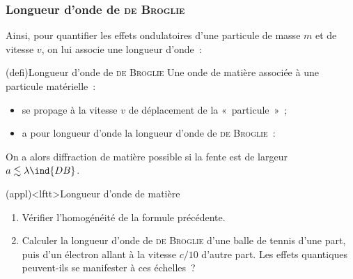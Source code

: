 \documentclass[../../main/main.tex]{subfiles}
\begin{document}
\subsubsection{Longueur d'onde de \textsc{de Broglie}}
\label{sssec:lgdb}
Ainsi, pour quantifier les effets ondulatoires d'une particule de masse $m$ et
de vitesse $v$, on lui associe une longueur d'onde~:
\begin{tcb*}(defi){Longueur d'onde de \textsc{de Broglie}}
	Une onde de matière associée à une particule matérielle~:
	\begin{itemize}
		\item se propage à la vitesse $v$ de déplacement de la «~particule~»~;
		\item a pour longueur d'onde la longueur d'onde de \textsc{de Broglie}~:
		      \psw{%
			      \[
				      \boxed{\lambda\ind{DB} = \frac{h}{p}}
			      \]
		      }%
	\end{itemize}
	On a alors diffraction de matière possible si la fente est de
	largeur $a \lesssim \lambda\ind{DB}$.
\end{tcb*}

\begin{tcb}[breakable](appl)<lftt>{Longueur d'onde de matière}
	\begin{enumerate}
		\item Vérifier l'homogénéité de la formule précédente.
		      \smallbreak
		\item Calculer la longueur d'onde de \textsc{de Broglie} d'une balle de
		      tennis d'une part, puis d'un électron allant à la vitesse $c/10$ d'autre
		      part. Les effets quantiques peuvent-ils se manifester à ces échelles~?
		      \smallbreak
	\end{enumerate}
\end{tcb}
\end{document}
